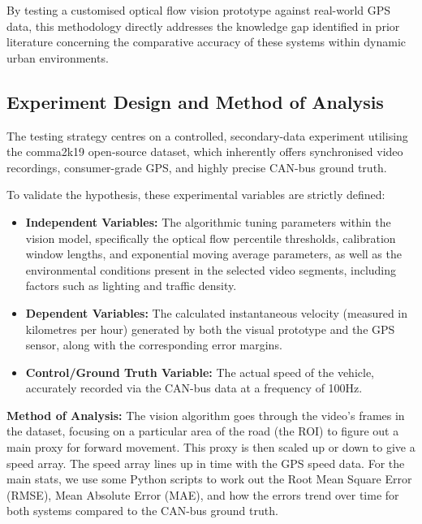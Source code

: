 By testing a customised optical flow vision prototype against real-world GPS data, this methodology directly addresses the knowledge gap identified in prior literature concerning the comparative accuracy of these systems within dynamic urban environments.

\subsection{Experiment Design and Method of Analysis}
The testing strategy centres on a controlled, secondary-data experiment utilising the comma2k19 open-source dataset, which inherently offers synchronised video recordings, consumer-grade GPS, and highly precise CAN-bus ground truth.

To validate the hypothesis, these experimental variables are strictly defined:
\begin{itemize}
    \item \textbf{Independent Variables:} The algorithmic tuning parameters within the vision model, specifically the optical flow percentile thresholds, calibration window lengths, and exponential moving average parameters, as well as the environmental conditions present in the selected video segments, including factors such as lighting and traffic density.
    \item \textbf{Dependent Variables:} The calculated instantaneous velocity (measured in kilometres per hour) generated by both the visual prototype and the GPS sensor, along with the corresponding error margins.
    \item \textbf{Control/Ground Truth Variable:} The actual speed of the vehicle, accurately recorded via the CAN-bus data at a frequency of 100Hz.
\end{itemize}

\textbf{Method of Analysis:} The vision algorithm goes through the video's frames in the dataset, focusing on a particular area of the road (the ROI) to figure out a main proxy for forward movement. This proxy is then scaled up or down to give a speed array. The speed array lines up in time with the GPS speed data. For the main stats, we use some Python scripts to work out the Root Mean Square Error (RMSE), Mean Absolute Error (MAE), and how the errors trend over time for both systems compared to the CAN-bus ground truth.

